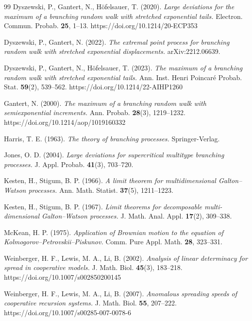 \documentclass[12pt]{article}
\numberwithin{equation}{section}
\begin{document}
\begin{thebibliography}{99}
Dyszewski, P., Gantert, N., Höfelsauer, T. (2020). \emph{Large deviations for the maximum of a branching random walk with stretched exponential tails.} Electron. Commun. Probab. \textbf{25}, 1–13. https://doi.org/10.1214/20-ECP353  

Dyszewski, P., Gantert, N. (2022). \emph{The extremal point process for branching random walk with stretched exponential displacements.} arXiv:2212.06639.  

Dyszewski, P., Gantert, N., Höfelsauer, T. (2023). \emph{The maximum of a branching random walk with stretched exponential tails.} Ann. Inst. Henri Poincaré Probab. Stat. \textbf{59}(2), 539–562. https://doi.org/10.1214/22-AIHP1260  



Gantert, N. (2000). \emph{The maximum of a branching random walk with semiexponential increments.} Ann. Probab. \textbf{28}(3), 1219–1232. https://doi.org/10.1214/aop/1019160332  
  
Harris, T. E. (1963). \emph{The theory of branching processes.} Springer-Verlag.  

Jones, O. D. (2004). \emph{Large deviations for supercritical multitype branching processes.} J. Appl. Probab. \textbf{41}(3), 703–720.  

Kesten, H., Stigum, B. P. (1966). \emph{A limit theorem for multidimensional Galton–Watson processes.} Ann. Math. Statist. \textbf{37}(5), 1211–1223.  

Kesten, H., Stigum, B. P. (1967). \emph{Limit theorems for decomposable multi-dimensional Galton–Watson processes.} J. Math. Anal. Appl. \textbf{17}(2), 309–338.  


McKean, H. P. (1975). \emph{Application of Brownian motion to the equation of Kolmogorov–Petrovskii–Piskunov.} Comm. Pure Appl. Math. \textbf{28}, 323–331.  


Weinberger, H. F., Lewis, M. A., Li, B. (2002). \emph{Analysis of linear determinacy for spread in cooperative models.} J. Math. Biol. \textbf{45}(3), 183–218. https://doi.org/10.1007/s002850200145  

Weinberger, H. F., Lewis, M. A., Li, B. (2007). \emph{Anomalous spreading speeds of cooperative recursion systems.} J. Math. Biol. \textbf{55}, 207–222. https://doi.org/10.1007/s00285-007-0078-6  

\end{thebibliography}
\end{document}
